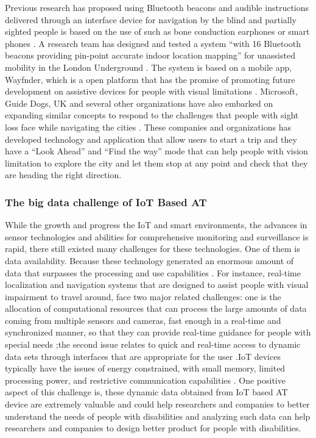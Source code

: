 Previous research has proposed using Bluetooth beacons and audible 
instructions delivered through an interface device for navigation 
by the blind and partially sighted people is based on the use of 
such as bone conduction earphones or smart phones \cite{Barbeau,Shah}. 
A research team has designed and tested a system ``with 16 Bluetooth beacons 
providing pin-point accurate indoor location mapping'' 
for unassisted mobility in the London Underground \cite{Shah}. The system is based on a mobile app, Wayfnder,  which is 
a open platform that has the promise of promoting future 
development on assistive devices for people with visual limitations \cite{Shah}. 
Microsoft, Guide Dogs, UK and several other organizations have also embarked
on expanding similar concepts to respond to the challenges that people with sight
loss face while navigating the cities \cite{Shah}.  These companies and organizations
has developed technology and application that allow users to start a trip and they 
have a ``Look Ahead'' and ``Find the way'' mode that can help people with vision
limitation to explore the city and let them stop at any point and check 
that they are heading the right direction. 

\subsubsection{The big data challenge of IoT Based AT}
While the growth and progress the IoT and smart
environments, the advances in sensor technologies and abilities for comprehensive
monitoring and surveillance is rapid, there still existed many challenges for these 
technologies. One of them is data availability. Because these technology generated an
enormous amount of data that surpasses the processing and use capabilities \cite{Shah}. For
instance, real-time localization and navigation systems that are designed to assist people 
with visual impairment to travel around, face two major related challenges: one is 
the allocation of computational resources that can process the large
amounts of data coming from multiple sensors and cameras, fast enough in a real-time
and synchronized manner, so that they can provide real-time guidance for people 
with special needs \cite{Shah};the second issue relates to quick and real-time access to
dynamic data sets through interfaces that are appropriate for the user \cite{Shah}.IoT devices 
typically have the issues of energy constrained, with small memory, limited processing 
power, and restrictive communication capabilities \cite{Shah}. One positive aspect of this 
challenge is, these dynamic data obtained from IoT based AT device are extremely 
valuable and could help researchers and companies to better understand the 
needs of people with disabilities and analyzing such data can help researchers 
and companies to design better product for people with disabilities.

